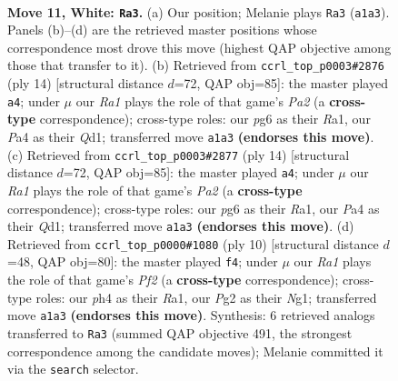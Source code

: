 \documentclass[11pt]{article}
\begin{document}
\clearpage

\begin{figure}[p]\centering
\begin{subfigure}{0.46\textwidth}\centering
\resizebox{\linewidth}{!}{%
\newchessgame
\chessboard[
  setfen={rnbqkb1r/5p2/1p1p1np1/p1pP4/P3P2p/2N1B3/1P3PPP/R2QKBNR w KQkq - 0 11},
  showmover=false,
  pgfstyle=straightmove, color=movearrow, markmove={a1-a3}
]}
\caption{}
\end{subfigure}\hfill
\begin{subfigure}{0.46\textwidth}\centering
\resizebox{\linewidth}{!}{%
\newchessgame
\chessboard[
  setfen={rnbqkb1r/1p3p1p/p2p1np1/2pP4/4P3/2N2N2/PP3PPP/R1BQKB1R w KQkq - 0 8},
  showmover=false,
  pgfstyle=straightmove, color=movearrow, markmove={a2-a4}
]}
\caption{}
\end{subfigure}
\\[4pt]
\begin{subfigure}{0.46\textwidth}\centering
\resizebox{\linewidth}{!}{%
\newchessgame
\chessboard[
  setfen={rnbqkb1r/1p3p1p/p2p1np1/2pP4/4P3/2N2N2/PP3PPP/R1BQKB1R w KQkq - 0 8},
  showmover=false,
  pgfstyle=straightmove, color=movearrow, markmove={a2-a4}
]}
\caption{}
\end{subfigure}\hfill
\begin{subfigure}{0.46\textwidth}\centering
\resizebox{\linewidth}{!}{%
\newchessgame
\chessboard[
  setfen={rnbqkb1r/pp3p1p/3p1np1/2pPp3/2P1P3/2N5/PP3PPP/R1BQKBNR w KQkq - 0 6},
  showmover=false,
  pgfstyle=straightmove, color=movearrow, markmove={f2-f4}
]}
\caption{}
\end{subfigure}
\caption{\textbf{Move 11, White: \texttt{Ra3}.} (a) Our position; Melanie plays \texttt{Ra3} (\texttt{a1a3}). Panels (b)--(d) are the retrieved master positions whose correspondence most drove this move (highest QAP objective among those that transfer to it). (b) Retrieved from \texttt{ccrl\_top\_p0003\#2876} (ply 14) [structural distance $d$=72, QAP obj=85]: the master played \texttt{a4}; under $\mu$ our \emph{Ra1} plays the role of that game's \emph{Pa2} (a \textbf{cross-type} correspondence); cross-type roles: our \emph{p}g6 as their \emph{R}a1, our \emph{P}a4 as their \emph{Q}d1; transferred move \texttt{a1a3} \textbf{(endorses this move)}. (c) Retrieved from \texttt{ccrl\_top\_p0003\#2877} (ply 14) [structural distance $d$=72, QAP obj=85]: the master played \texttt{a4}; under $\mu$ our \emph{Ra1} plays the role of that game's \emph{Pa2} (a \textbf{cross-type} correspondence); cross-type roles: our \emph{p}g6 as their \emph{R}a1, our \emph{P}a4 as their \emph{Q}d1; transferred move \texttt{a1a3} \textbf{(endorses this move)}. (d) Retrieved from \texttt{ccrl\_top\_p0000\#1080} (ply 10) [structural distance $d$=48, QAP obj=80]: the master played \texttt{f4}; under $\mu$ our \emph{Ra1} plays the role of that game's \emph{Pf2} (a \textbf{cross-type} correspondence); cross-type roles: our \emph{p}h4 as their \emph{R}a1, our \emph{P}g2 as their \emph{N}g1; transferred move \texttt{a1a3} \textbf{(endorses this move)}. Synthesis: 6 retrieved analogs transferred to \texttt{Ra3} (summed QAP objective 491, the strongest correspondence among the candidate moves); Melanie committed it via the \texttt{search} selector.}

\end{figure}
\end{document}
